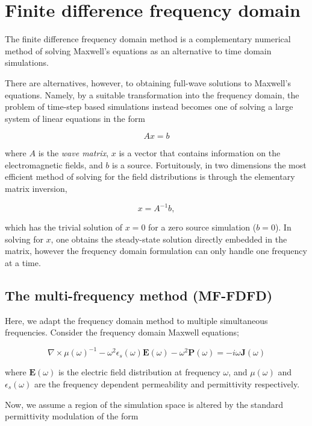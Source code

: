 \chapter{Finite difference frequency domain}

The finite difference frequency domain method is a complementary numerical method of solving Maxwell's equations as an alternative to time domain simulations. 

There are alternatives, however, to obtaining full-wave solutions to Maxwell's equations. Namely, by a suitable transformation into the frequency domain, the problem of time-step based simulations instead becomes one of solving a large system of linear equations in the form

\begin{equation}
Ax = b
\end{equation}

where $A$ is the \textit{wave matrix}, $x$ is a vector that contains information on the electromagnetic fields, and $b$ is a source. Fortuitously, in two dimensions the most efficient method of solving for the field distributions is through the elementary matrix inversion,

\begin{equation}
x = A^{-1}b,
\end{equation}
 
which has the trivial solution of $x=0$ for a zero source simulation ($b=0$). In solving for $x$, one obtains the steady-state solution directly embedded in the matrix, however the frequency domain formulation can only handle one frequency at a time.


\section{The multi-frequency method (MF-FDFD)}
Here, we adapt the frequency domain method to multiple simultaneous frequencies.
Consider the frequency domain Maxwell equations;

\begin{equation}
\nabla \times \mu(\omega)^{-1} - \omega^2 \epsilon_s (\omega) \bm{E}(\omega) - \omega^2 \bm{P}(\omega) = -i \omega \bm{J}(\omega)
\end{equation}

where $\bm{E}(\omega)$ is the electric field distribution at frequency $\omega$, and $\mu(\omega)$ and $\epsilon_s(\omega)$ are the frequency dependent permeability and permittivity respectively. 

Now, we assume a region of the simulation space is altered by the standard permittivity modulation of the form

